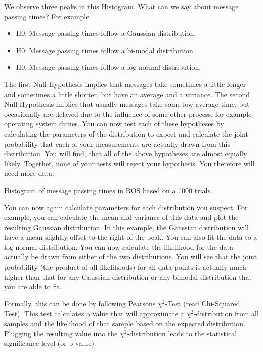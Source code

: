 We observe three peaks in this Histogram. What can we say about message passing times? For example
\begin{itemize}
\item H0: Message passing times follow a Gaussian distribution.
\item H0: Message passing times follow a bi-modal distribution.
\item H0: Message passing times follow a log-normal distribution.
\end{itemize}

The first Null Hypothesis implies that messages take sometimes a little longer and sometimes a little shorter, but have an average and a variance. The second Null Hypothesis implies that usually messages take some low average time, but occasionally are delayed due to the influence of some other process, for example operating system duties. You can now test each of these hypotheses by calculating the parameters of the distribution to expect and calculate the joint probability that each of your measurements are actually drawn from this distribution. You will find, that all of the above hypotheses are almost equally likely. Together, none of your tests will reject your hypothesis. You therefore will need more data:

\begin{mdframed}
Histogram of message passing times in ROS based on a 1000 trials.
\end{mdframed}

You can now again calculate parameters for each distribution you suspect. For example, you can calculate the mean and variance of this data and plot the resulting Gaussian distribution. In this example, the Gaussian distribution will have a mean slightly offset to the right of the peak. You can also fit the data to a log-normal distribution. You can now calculate the likelihood for the data actually be drawn from either of the two distributions. You will see that the joint probability (the product of all likelihoods) for all data points is actually much higher than that for any Gaussian distribution or any bimodal distribution that you are able to fit.

Formally, this can be done by following Pearsons $ \chi^2$-Test (read Chi-Squared Test). This test calculates a value that will approximate a $ \chi^2$-distribution from all samples and the likelihood of that sample based on the expected distribution. Plugging the resulting value into the $ \chi^2$-distribution leads to the statistical significance level (or p-value).

